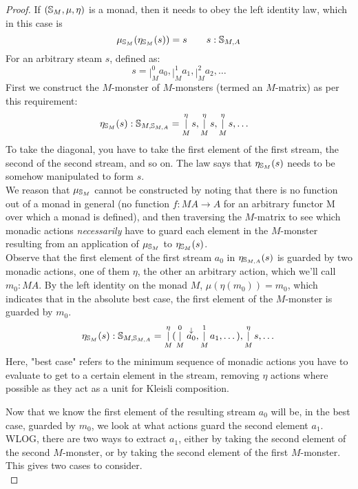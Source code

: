 \documentclass{article}
\begin{document}
\begin{proof}
If $(\mathbb{S}_{M}, \mu, \eta)$ is a monad, then it needs to obey the left identity law, which in this case is
$$
\mu_{\mathbb{S}_{M}}(\eta_{\mathbb{S}_{M}}(s)) = s
\qquad s : \mathbb{S}_{M,A}
$$
For an arbitrary steam $s$, defined as:
$$
s = \mathop{|}_M^0 a_0, \mathop{|}_M^1 a_1, \mathop{|}_M^2  a_2, \dots
$$
First we construct the $M$-monster of $M$-monsters (termed an $M$-matrix) as per this requirement:
\begin{align*}
&\eta_{\mathbb{S}_{M}}(s) : \mathbb{S}_{M,\mathbb{S}_{M,A}} = \mathop{|}_M^\eta s, \mathop{|}_M^\eta s, \mathop{|}_M^\eta s, \dots
\end{align*}
To take the diagonal, you have to take the first element of the first stream, the second of the second stream, and so on. The law says that $\eta_{\mathbb{S}_{M}}(s)$ needs to be somehow manipulated to form $s$. \\

We reason that $\mu_{\mathbb{S}_{M}}$ cannot be constructed by noting that there is no function out of a monad in general (no function $f : MA \to A$ for an arbitrary functor M over which a monad is defined), and then traversing the $M$-matrix to see which monadic actions \emph{necessarily} have to guard each element in the $M$-monster resulting from an application of $\mu_{\mathbb{S}_{M}}$ to $\eta_{\mathbb{S}_{M}}(s)$.\\

Observe that the first element of the first stream $a_0$ in $\eta_{\mathbb{S}_{M,A}}(s)$ is guarded by two monadic actions, one of them $\eta$, the other an arbitrary action, which we'll call $m_0 : MA$. By the left identity on the monad $M$, $\mu(\eta(m_0)) = m_0$, which indicates that in the absolute best case, the first element of the $M$-monster is guarded by $m_0$.
$$
\eta_{\mathbb{S}_{M}}(s) : \mathbb{S}_{M,\mathbb{S}_{M,A}} = \mathop{|}_M^\eta (\mathop{|}_M^0 \stackrel{\downarrow}{a_0}, \mathop{|}_M^1 a_1, \dots), \mathop{|}_M^\eta s, \dots
$$
Here, "best case" refers to the minimum sequence of monadic actions you have to evaluate to get to a certain element in the stream, removing $\eta$ actions where possible as they act as a unit for Kleisli composition.

Now that we know the first element of the resulting stream $a_0$ will be, in the best case, guarded by $m_0$, we look at what actions guard the second element $a_1$. WLOG, there are two ways to extract $a_1$, either by taking the second element of the second $M$-monster, or by taking the second element of the first $M$-monster. This gives two cases to consider.\\


\end{proof}
\end{document}
